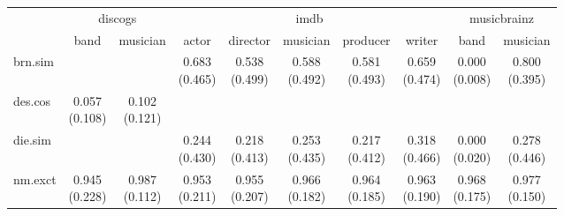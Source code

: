 \documentclass[epsfig,a4paper,11pt,titlepage,twoside,openany]{book}
\begin{document}
\begin{table}[H]
\centering
\begin{tabular}{l|c|c|c|c|c|c|c|c|c|}
\cline{2-10}
                                                           & \multicolumn{2}{c|}{discogs} & \multicolumn{5}{c|}{imdb}                                                & \multicolumn{2}{c|}{musicbrainz} \\ \cline{2-10} 
                                                           & band          & musician     & actor        & director     & musician     & producer     & writer       & band            & musician       \\ \hline
\multicolumn{1}{|l|}{brn.sim}                        &               &              & \makecell{0.683 \\ (0.465)} & \makecell{0.538 \\ (0.499)} & \makecell{0.588 \\ (0.492)} & \makecell{0.581 \\ (0.493)} & \makecell{0.659 \\ (0.474)} & \makecell{0.000 \\ (0.008)}    & \makecell{0.800 \\ (0.395)}   \\ \hline
\multicolumn{1}{|l|}{des.cos}                  & \makecell{0.057 \\ (0.108)}  & \makecell{0.102 \\ (0.121)} &              &              &              &              &              &                 &                \\ \hline
\multicolumn{1}{|l|}{die.sim}                        &               &              & \makecell{0.244 \\ (0.430)} & \makecell{0.218 \\ (0.413)} & \makecell{0.253 \\ (0.435)} & \makecell{0.217 \\ (0.412)} & \makecell{0.318 \\ (0.466)} & \makecell{0.000 \\ (0.020)}    & \makecell{0.278 \\ (0.446)}   \\ \hline
\multicolumn{1}{|l|}{nm.exct}                          & \makecell{0.945 \\ (0.228)}  & \makecell{0.987 \\ (0.112)} & \makecell{0.953 \\ (0.211)} & \makecell{0.955 \\ (0.207)} & \makecell{0.966 \\ (0.182)} & \makecell{0.964 \\ (0.185)} & \makecell{0.963 \\ (0.190)} & \makecell{0.968 \\ (0.175)}    & \makecell{0.977 \\ (0.150)}   \\ \hline

\end{tabular}
\end{table}
\end{document}
